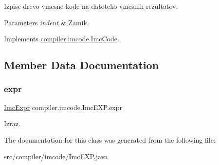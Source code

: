 Izpise drevo vmesne kode na datoteko vmesnih rezultatov.


\begin{DoxyParams}{Parameters}
{\em indent} & Zamik. \\
\hline
\end{DoxyParams}


Implements \hyperlink{interfacecompiler_1_1imcode_1_1_imc_code_a26451dea2ab4dbd7054ac33f4c6d71fe}{compiler.\+imcode.\+Imc\+Code}.



\subsection{Member Data Documentation}
\mbox{\label{classcompiler_1_1imcode_1_1_imc_e_x_p_a6c27c2311a3fbb303532200e4777832f}} 
\subsubsection{\texorpdfstring{expr}{expr}}
{\footnotesize\ttfamily \hyperlink{classcompiler_1_1imcode_1_1_imc_expr}{Imc\+Expr} compiler.\+imcode.\+Imc\+E\+X\+P.\+expr}

Izraz. 

The documentation for this class was generated from the following file\+:\begin{DoxyCompactItemize}
\item 
src/compiler/imcode/Imc\+E\+X\+P.\+java\end{DoxyCompactItemize}
